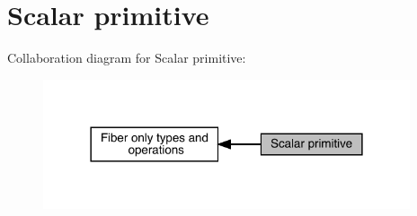 \hypertarget{group__primscalar}{}\section{Scalar primitive}
\label{group__primscalar}
Collaboration diagram for Scalar primitive\+:\nopagebreak
\begin{figure}[H]
\begin{center}
\leavevmode
\includegraphics[width=306pt]{db/dcc/group__primscalar}
\end{center}
\end{figure}
